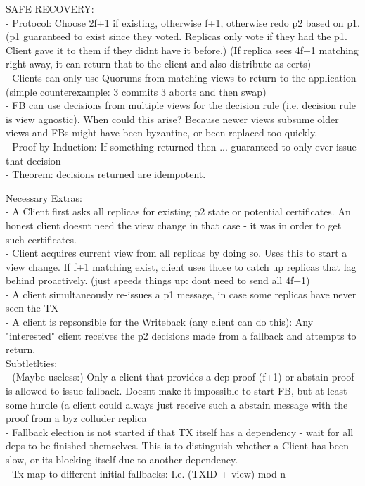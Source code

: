 SAFE RECOVERY:\\
- Protocol: Choose 2f+1 if existing, otherwise f+1, otherwise redo p2 based on p1. (p1 guaranteed to exist since they voted. Replicas only vote if they had the p1. Client gave it to them if they didnt have it before.) (If replica sees 4f+1 matching right away, it can return that to the client and also distribute as certs)\\
- Clients can only use Quorums from matching views to return to the application (simple counterexample: 3 commits 3 aborts and then swap)\\
- FB can use decisions from multiple views for the decision rule (i.e. decision rule is view agnostic). When could this arise? Because newer views subsume older views and FBs might have been byzantine, or been replaced too quickly. \\
- Proof by Induction: If something returned then ... guaranteed to only ever issue that decision\\
- Theorem: decisions returned are idempotent.



Necessary Extras:\\
- A Client first asks all replicas for existing p2 state or potential certificates. An honest client doesnt need the view change in that case - it was in order to get such certificates.\\
- Client acquires current view from all replicas by doing so. Uses this to start a view change. If f+1 matching exist, client uses those to catch up replicas that lag behind proactively. (just speeds things up: dont need to send all 4f+1)\\
- A client simultaneously re-issues a p1 message, in case some replicas have never seen the TX\\
- A client is repsonsible for the Writeback (any client can do this): Any "interested" client receives the p2 decisions made from a fallback and attempts to return. \\


Subtletlties:\\
- (Maybe useless:) Only a client that provides a dep proof (f+1) or abstain proof is allowed to issue fallback. Doesnt make it impossible to start FB, but at least some hurdle (a client could always just receive such a abstain message with the proof from a byz colluder replica\\
- Fallback election is not started if that TX itself has a dependency - wait for all deps to be finished themselves. This is to distinguish whether a Client has been slow, or its blocking itself due to another dependency.\\
- Tx map to different initial fallbacks: I.e. (TXID + view) mod n \\

